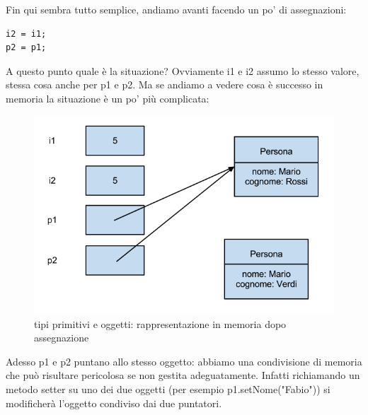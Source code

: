 Fin qui sembra tutto semplice, andiamo avanti facendo un po’ di assegnazioni:
\begin{lstlisting}
i2 = i1;
p2 = p1;
\end{lstlisting}
A questo punto quale è la situazione? Ovviamente i1 e i2 assumo lo stesso valore, stessa cosa anche per p1 e p2. Ma se andiamo a vedere cosa è successo in memoria la situazione è un po’ più complicata: 	
\begin{figure}[H]
\centering
\includegraphics[scale=0.42]{images/memoria1}
\caption{tipi primitivi e oggetti: rappresentazione in memoria dopo assegnazione\label{fig:UC3}}
\end{figure}
Adesso p1 e p2 puntano allo stesso oggetto: abbiamo una condivisione di memoria che può risultare pericolosa se non gestita adeguatamente. Infatti richiamando un metodo setter su uno dei due oggetti (per esempio p1.setNome("Fabio")) si modificherà l’oggetto condiviso dai due puntatori. 

